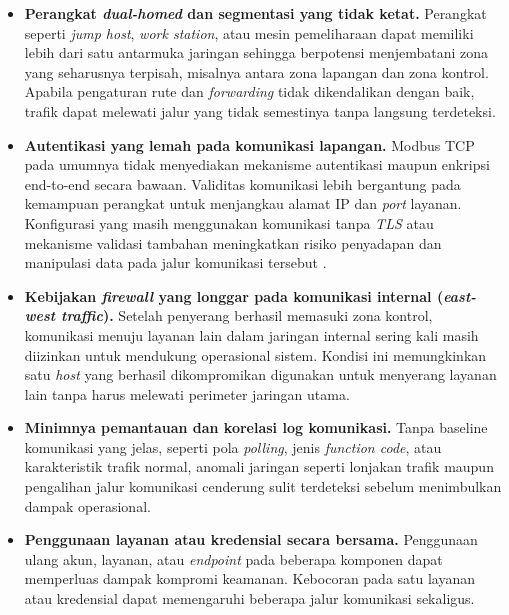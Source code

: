 \begin{itemize}

    \item \textbf{Perangkat \textit{dual-homed} dan segmentasi yang tidak ketat.}  
    Perangkat seperti \textit{jump host}, \textit{work station}, atau mesin pemeliharaan dapat memiliki lebih dari satu antarmuka jaringan sehingga berpotensi menjembatani zona yang seharusnya terpisah, misalnya antara zona lapangan dan zona kontrol. Apabila pengaturan rute dan \textit{forwarding} tidak dikendalikan dengan baik, trafik dapat melewati jalur yang tidak semestinya tanpa langsung terdeteksi.

    \item \textbf{Autentikasi yang lemah pada komunikasi lapangan.}  
    Modbus TCP pada umumnya tidak menyediakan mekanisme autentikasi maupun enkripsi end-to-end secara bawaan. Validitas komunikasi lebih bergantung pada kemampuan perangkat untuk menjangkau alamat IP dan \textit{port} layanan. Konfigurasi yang masih menggunakan komunikasi tanpa \textit{TLS} atau mekanisme validasi tambahan meningkatkan risiko penyadapan dan manipulasi data pada jalur komunikasi tersebut \citep{mckinney2022mitm}.

    \item \textbf{Kebijakan \textit{firewall} yang longgar pada komunikasi internal (\textit{east-west traffic}).}  
    Setelah penyerang berhasil memasuki zona kontrol, komunikasi menuju layanan lain dalam jaringan internal sering kali masih diizinkan untuk mendukung operasional sistem. Kondisi ini memungkinkan satu \textit{host} yang berhasil dikompromikan digunakan untuk menyerang layanan lain tanpa harus melewati perimeter jaringan utama.

    \item \textbf{Minimnya pemantauan dan korelasi log komunikasi.}  
    Tanpa baseline komunikasi yang jelas, seperti pola \textit{polling}, jenis \textit{function code}, atau karakteristik trafik normal, anomali jaringan seperti lonjakan trafik maupun pengalihan jalur komunikasi cenderung sulit terdeteksi sebelum menimbulkan dampak operasional.

    \item \textbf{Penggunaan layanan atau kredensial secara bersama.}  
    Penggunaan ulang akun, layanan, atau \textit{endpoint} pada beberapa komponen dapat memperluas dampak kompromi keamanan. Kebocoran pada satu layanan atau kredensial dapat memengaruhi beberapa jalur komunikasi sekaligus.

\end{itemize}

